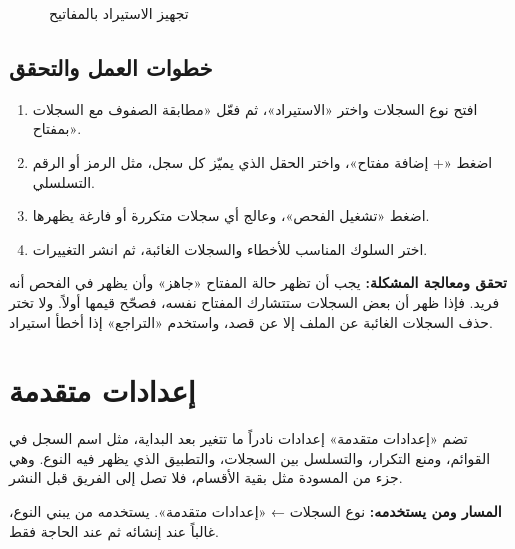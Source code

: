 \begin{figure}[H]
\centering
{}
\rclegend
\caption{تجهيز الاستيراد بالمفاتيح}
\label{fig:builder-import-flow}
\end{figure}

\subsection{خطوات العمل والتحقق}
\begin{enumerate}
\item افتح نوع السجلات واختر «الاستيراد»، ثم فعّل «مطابقة الصفوف مع السجلات بمفتاح».
\item اضغط «+ إضافة مفتاح»، واختر الحقل الذي يميّز كل سجل، مثل الرمز أو الرقم التسلسلي.
\item اضغط «تشغيل الفحص»، وعالج أي سجلات متكررة أو فارغة يظهرها.
\item اختر السلوك المناسب للأخطاء والسجلات الغائبة، ثم انشر التغييرات.
\end{enumerate}

\textbf{تحقق ومعالجة المشكلة:} يجب أن تظهر حالة المفتاح «جاهز» وأن يظهر في الفحص أنه فريد. فإذا ظهر أن بعض السجلات ستتشارك المفتاح نفسه، فصحّح قيمها أولاً. ولا تختر حذف السجلات الغائبة عن الملف إلا عن قصد، واستخدم «التراجع» إذا أخطأ استيراد.

\clearpage
\section{إعدادات متقدمة}
\label{sec:builder-feature-advanced}

تضم «إعدادات متقدمة» إعدادات نادراً ما تتغير بعد البداية، مثل اسم السجل في القوائم، ومنع التكرار، والتسلسل بين السجلات، والتطبيق الذي يظهر فيه النوع. وهي جزء من المسودة مثل بقية الأقسام، فلا تصل إلى الفريق قبل النشر.

\textbf{المسار ومن يستخدمه:} نوع السجلات ← «إعدادات متقدمة». يستخدمه من يبني النوع، غالباً عند إنشائه ثم عند الحاجة فقط.

